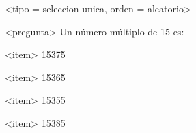 <tipo = seleccion unica, orden = aleatorio>

<pregunta>
Un número múltiplo de 15 es:

<item>
15375

<item>
15365

<item>
15355

<item>
15385

